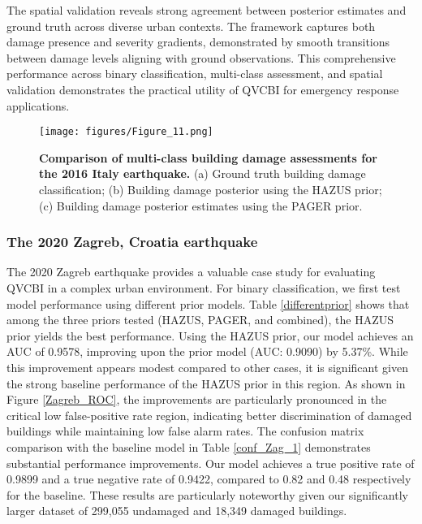 \documentclass[review]{elsarticle}
\begin{document}
The spatial validation reveals strong agreement between posterior estimates and ground truth across diverse urban contexts. The framework captures both damage presence and severity gradients, demonstrated by smooth transitions between damage levels aligning with ground observations. This comprehensive performance across binary classification, multi-class assessment, and spatial validation demonstrates the practical utility of QVCBI for emergency response applications.






\begin{figure*}[t]
    \centering
    \texttt{[image: figures/Figure\_11.png]}
    \caption{\textbf{Comparison of multi-class building damage assessments for the 2016 Italy earthquake.} (a) Ground truth building damage classification; (b) Building damage posterior using the HAZUS prior; (c) Building damage posterior estimates using the PAGER prior.}
    \label{Italy_mul}
\end{figure*}
    


\subsubsection{The 2020 Zagreb, Croatia earthquake}

The 2020 Zagreb earthquake provides a valuable case study for evaluating QVCBI in a complex urban environment. For binary classification, we first test model performance using different prior models. Table \ref{differentprior} shows that among the three priors tested (HAZUS, PAGER, and combined), the HAZUS prior yields the best performance. Using the HAZUS prior, our model achieves an AUC of 0.9578, improving upon the prior model (AUC: 0.9090) by 5.37\%. While this improvement appears modest compared to other cases, it is significant given the strong baseline performance of the HAZUS prior in this region. As shown in Figure \ref{Zagreb_ROC}, the improvements are particularly pronounced in the critical low false-positive rate region, indicating better discrimination of damaged buildings while maintaining low false alarm rates.
The confusion matrix comparison with the baseline model \cite{rao2022earthquake} in Table \ref{conf_Zag_1} demonstrates substantial performance improvements. Our model achieves a true positive rate of 0.9899 and a true negative rate of 0.9422, compared to 0.82 and 0.48 respectively for the baseline. These results are particularly noteworthy given our significantly larger dataset of 299,055 undamaged and 18,349 damaged buildings.
\end{document}

